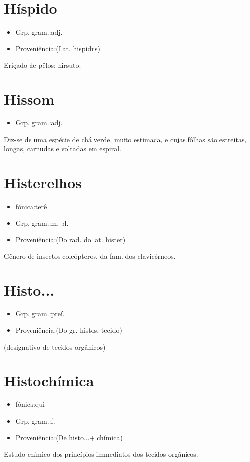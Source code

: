 \documentclass{article}
\begin{document}
\section{Híspido}
\begin{itemize}
\item {Grp. gram.:adj.}
\end{itemize}
\begin{itemize}
\item {Proveniência:(Lat. \textunderscore hispidus\textunderscore )}
\end{itemize}
Eriçado de pêlos; hirsuto.
\section{Hissom}
\begin{itemize}
\item {Grp. gram.:adj.}
\end{itemize}
Diz-se de uma espécie de chá verde, muito estimada, e cujas fôlhas são estreitas, longas, carnudas e voltadas em espiral.
\section{Histerelhos}
\begin{itemize}
\item {fónica:terê}
\end{itemize}
\begin{itemize}
\item {Grp. gram.:m. pl.}
\end{itemize}
\begin{itemize}
\item {Proveniência:(Do rad. do lat. \textunderscore hister\textunderscore )}
\end{itemize}
Gênero de insectos coleópteros, da fam. dos clavicórneos.
\section{Histo...}
\begin{itemize}
\item {Grp. gram.:pref.}
\end{itemize}
\begin{itemize}
\item {Proveniência:(Do gr. \textunderscore histos\textunderscore , tecido)}
\end{itemize}
(designativo de tecidos orgânicos)
\section{Histochímica}
\begin{itemize}
\item {fónica:qui}
\end{itemize}
\begin{itemize}
\item {Grp. gram.:f.}
\end{itemize}
\begin{itemize}
\item {Proveniência:(De \textunderscore histo...\textunderscore  + \textunderscore chímica\textunderscore )}
\end{itemize}
Estudo chímico dos princípios immediatos dos tecidos orgânicos.
\end{document}
